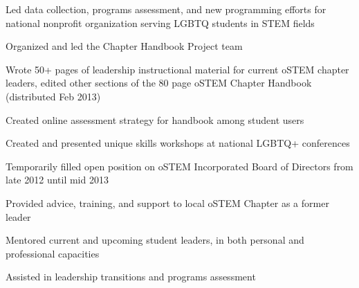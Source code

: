 \documentclass[letterpaper]{deedy-resume} %
\begin{document}
\begin{minipage}[t]{1\textwidth}
\vspace{\topsep} %
\begin{tightitemize}

\item Led data collection, programs assessment, and new programming efforts for national nonprofit organization serving LGBTQ students in STEM fields

\item Organized and led the Chapter Handbook Project team

\item Wrote 50+ pages of leadership instructional material for current oSTEM chapter leaders, edited other sections of the 80 page oSTEM Chapter Handbook (distributed Feb 2013)

\item Created online assessment strategy for handbook among student users

\item Created and presented unique skills workshops at national LGBTQ+ conferences

\item Temporarily filled open position on oSTEM Incorporated Board of Directors from late 2012 until mid 2013

\end{tightitemize}

\sectionspace %



\vspace{\topsep} %
\begin{tightitemize}

\item Provided advice, training, and support to local oSTEM Chapter as a former leader

\item Mentored current and upcoming student leaders, in both personal and professional capacities

\item Assisted in leadership transitions and programs assessment

\end{tightitemize}


\end{minipage}
\end{document}
